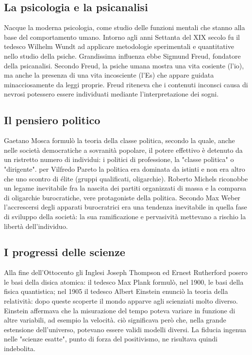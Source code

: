 \documentclass{report}
\begin{document}
\subsection{La psicologia e la psicanalisi}
Nacque la moderna psicologia, come studio delle funzioni mentali che stanno alla base del comportamento umano.
Intorno agli anni Settanta del XIX secolo fu il tedesco Wilhelm Wundt ad applicare metodologie sperimentali e quantitative nello studio della psiche.
Grandissima influenza ebbe Sigmund Freud, fondatore della psicanalisi. Secondo Freud, la psiche umana mostra una vita cosiente (l'io), ma anche la presenza di una vita incosciente (l'Es) che appare guidata minacciosamente da leggi proprie. Freud riteneva che i contenuti inconsci causa di nevrosi potessero essere individuati mediante l'interpretazione dei sogni.

\subsection{Il pensiero politico}
Gaetano Mosca formulò la teoria della classe politica, secondo la quale, anche nelle società democratiche a sovranità popolare, il potere effettivo è detenuto da un ristretto numero di individui: i politici di professione, la "classe politica" o "dirigente". per Vilfredo Pareto la politica era dominata da istinti e non era altro che uno scontro di élite (gruppi qualificati, oligarchie). Roberto Michels riconobbe un legame inevitabile fra la nascita dei partiti organizzati di massa e la comparsa di oligarchie burocratiche, vere protagoniste della politica. Secondo Max Weber l'accrescersi degli apparati burocratrici era una tendenza inevitabile in quella fase di sviluppo della società: la sua ramificazione e pervasività mettevano a rischio la libertà dell'individuo.

\subsection{I progressi delle scienze}
Alla fine dell'Ottocento gli Inglesi Joseph Thompson ed Ernest Rutherford posero le basi della disica atomica: il tedesco Max Plank formulò, nel 1900, le basi della fisica quantistica; nel 1905 il tedesco Albert Einstein enunciò la teoria della relatività: dopo queste scoperte il mondo apparve agli scienziati molto diverso. Einstein affermava che la misurazione del tempo poteva variare in funzione di altre variabili, ad esempio la velocità. ciò significava però che, nella grande estensione dell'universo, potevano essere validi modelli diversi. La fiducia ingenua nelle "scienze esatte", punto di forza del positivismo, ne risultava quindi indebolita.
\end{document}
